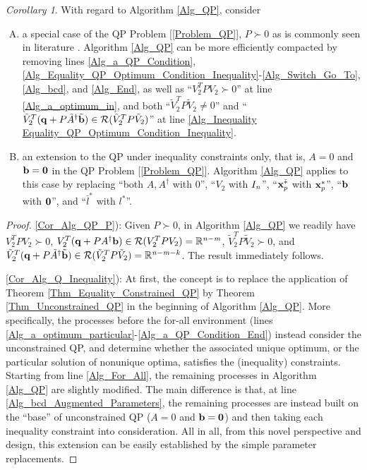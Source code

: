 \documentclass[9pt,twocolumn,twoside,lineno]{pnas-new-1}
\newcommand{\bfb}{{\bf b}}
\newcommand{\bfx}{{\bf x}}
\newcommand{\bfq}{{\bf q}}
\newcommand{\bfzero}{{\bf 0}}
\newcommand{\real}{\mathbb{R}}
\newcommand{\calR}{{\mathcal R}}
\newcommand{\itk}{{\it k}}
\newcommand{\itm}{{\it m}}
\newcommand{\itn}{{\it n}}
\theoremstyle{remark}
\newtheorem{corollary}{Corollary}[section]
\begin{document}
\begin{corollary} With regard to Algorithm {\rm\ref{Alg_QP}}, consider
\begin{enumerate}[A)]
\item\label{Cor_Alg_QP_P} a special case of the QP Problem {\rm[\ref{Problem_QP}]}, $P\succ 0$ as is commonly seen in literature {\rm\citep{Lu(Ye):03(16)}}. Algorithm {\rm\ref{Alg_QP}} can be more efficiently compacted by removing lines {\rm\ref{Alg_a_QP_Condition}}, {\rm\ref{Alg_Equality_QP_Optimum_Condition_Inequality}}-{\rm\ref{Alg_Switch_Go_To}}, {\rm\ref{Alg_bcd}}, and {\rm\ref{Alg_End}}, as well as ``$V_2^TPV_2\succ 0$'' at line {\rm\ref{Alg_a_optimum_in}}, and both ``$\tilde V_2^TP\tilde V_2\ne 0$'' and ``$\tilde V_2^T(\bfq+P\tilde A^\dagger\tilde\bfb)\in\calR(\tilde V_2^TP\tilde V_2)$'' at line {\rm\ref{Alg_Inequality Equality_QP_Optimum_Condition_Inequality}}.
\item\label{Cor_Alg_Q_Inequality} an extension to the QP under inequality constraints only, that is, $A=0$ and $\bfb=\bfzero$ in the QP Problem {\rm[\ref{Problem_QP}]}. Algorithm {\rm\ref{Alg_QP}} applies to this case by replacing ``both $A, A^\dagger$ with $0$'', ``$V_2$ with $I_\itn$'', ``$\bfx_p^{\bar *}$ with $\bfx_p^*$'', ``$\bfb$ with $\bfzero$'', and ``$\bar l^*$ with $l^*$''.
\end{enumerate}
\label{Cor_Alg_QP}
\end{corollary}

\begin{proof}
\ref{Cor_Alg_QP_P}): Given $P\succ 0$, in Algorithm \ref{Alg_QP} we readily have $V_2^TPV_2\succ 0$, $V_2^T(\bfq+PA^\dagger\bfb)\in\calR(V_2^TPV_2)=\real^{\itn-\itm}$, $\tilde V_2^TP\tilde V_2\succ 0$, and $\tilde V_2^T(\bfq+P\tilde A^\dagger\tilde\bfb)\in\calR(\tilde V_2^TP\tilde V_2)=\real^{\itn-\itm-\itk}$. The result immediately follows.

\ref{Cor_Alg_Q_Inequality}): At first, the concept is to replace the application of Theorem \ref{Thm_Equality_Constrained_QP} by Theorem \ref{Thm_Unconstrained_QP} in the beginning of Algorithm \ref{Alg_QP}. More specifically, the processes before the for-all environment (lines \ref{Alg_a_optimum_particular}-\ref{Alg_a_QP_Condition_End}) instead consider the unconstrained QP, and determine whether the associated unique optimum, or the particular solution of nonunique optima, satisfies the (inequality) constraints. Starting from line \ref{Alg_For_All}, the remaining processes in Algorithm \ref{Alg_QP} are slightly modified. The main difference is that, at line \ref{Alg_bcd_Augmented_Parameters}, the remaining processes are instead built on the ``base'' of unconstrained QP ($A=0$ and $\bfb=\bfzero$) and then taking each inequality constraint into consideration. All in all, from this novel perspective and design, this extension can be easily established by the simple parameter replacements.
\end{proof}
\end{document}
